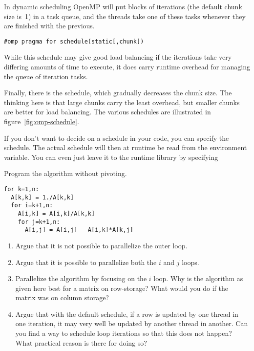 In dynamic scheduling OpenMP will put blocks of iterations
(the default chunk size is~1) in a task queue, and the threads take one of these
tasks whenever they are finished with the previous.
\begin{verbatim}
#omp pragma for schedule(static[,chunk])
\end{verbatim}
While this schedule may give good load balancing if the iterations
take very differing amounts of time to execute, it does carry runtime
overhead for managing the queue of iteration tasks.

Finally, there is the  schedule, which gradually decreases the chunk size.
The thinking here is that large chunks carry the least overhead, but smaller chunks are better
for load balancing.
%
The various schedules are illustrated in figure~\ref{fig:omp-schedule}.

If you don't want to decide on a schedule in your code, you can
specify the  schedule. The actual
schedule will then at runtime be read from the
 environment variable. You can even just
leave it to the runtime library by specifying

\begin{exercise}
  Program the  algorithm without pivoting.
\begin{verbatim}
for k=1,n:
  A[k,k] = 1./A[k,k]
  for i=k+1,n:
    A[i,k] = A[i,k]/A[k,k]
    for j=k+1,n:
      A[i,j] = A[i,j] - A[i,k]*A[k,j]
\end{verbatim}
\begin{enumerate}
\item Argue that it is not possible to parallelize the outer loop.
\item Argue that it is possible to parallelize both the $i$ and $j$ loops.
\item Parallelize the algorithm by focusing on the $i$ loop. Why is the algorithm as given here best
  for a matrix on row-storage? What would you do if the matrix was on column storage?
\item Argue that with the default schedule, if a row is updated by one thread in one iteration,
  it may very well be updated by another thread in another. Can you find a way to schedule
  loop iterations so that this does not happen? What practical reason is there for doing so?
\end{enumerate}
\end{exercise}

